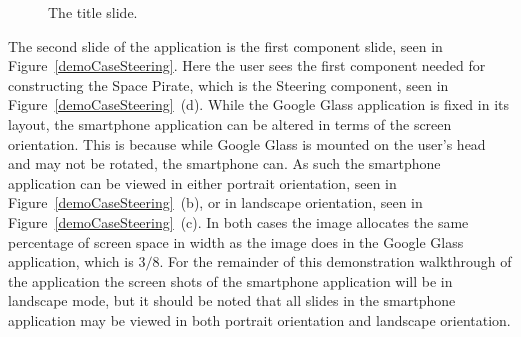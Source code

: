 	\begin{figure}[ht!]
		\centering
		\qquad
		\caption{The title slide.}
		\label{demoCase1}
	\end{figure}	

The second slide of the application is the first component slide, seen in Figure~\ref{demoCaseSteering}. Here the user sees the first component needed for constructing the Space Pirate, which is the Steering component, seen in Figure~\ref{demoCaseSteering}~(d). While the Google Glass application is fixed in its layout, the smartphone application can be altered in terms of the screen orientation. This is because while Google Glass is mounted on the user's head and may not be rotated, the smartphone can. As such the smartphone application can be viewed in either portrait orientation, seen in Figure~\ref{demoCaseSteering}~(b), or in landscape orientation, seen in Figure~\ref{demoCaseSteering}~(c). In both cases the image allocates the same percentage of screen space in width as the image does in the Google Glass application, which is \(3/8\). For the remainder of this demonstration walkthrough of the application the screen shots of the smartphone application will be in landscape mode, but it should be noted that all slides in the smartphone application may be viewed in both portrait orientation and landscape orientation.

